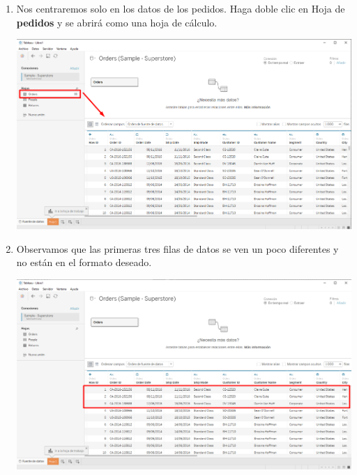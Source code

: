 \documentclass[12pt,letterpaper]{article}
\begin{document}
\begin{enumerate}
\begin{center}
        \end{center}
        \item Nos centraremos solo en los datos de los pedidos. Haga doble clic en Hoja de \textbf{pedidos} y se abrirá como una hoja de cálculo.
        \begin{center}
            \includegraphics[width=15cm]{./img/img6.png}
        \end{center}
        \item Observamos que las primeras tres filas de datos se ven un poco diferentes y no están en el formato deseado.
        \begin{center}
            \includegraphics[width=15cm]{./img/img7.png}
        \end{center}
    \end{enumerate}
\end{document}
